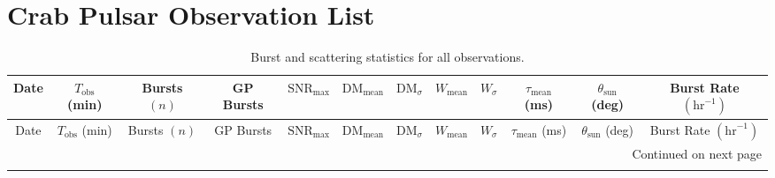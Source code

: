 
\chapter{Crab Pulsar Observation List} \label{appen:CrabTable}
\begin{landscape}

\begin{longtable}{cccccccccccc}
\caption{Burst and scattering statistics for all observations.}
\label{tab:bursts}\\

\toprule
Date &
$T_{\mathrm{obs}}$ (min) &
Bursts $(n)$ &
GP Bursts &
$\mathrm{SNR}_{\mathrm{max}}$ &
$\mathrm{DM}_{\mathrm{mean}}$ &
$\mathrm{DM}_{\sigma}$ &
$W_{\mathrm{mean}}$ &
$W_{\sigma}$ &
$\tau_{\mathrm{mean}}$ (ms) &
$\theta_{\mathrm{sun}}$ (deg) &
Burst Rate $(\mathrm{hr}^{-1})$ \\
\midrule
\endfirsthead

\toprule
Date &
$T_{\mathrm{obs}}$ (min) &
Bursts $(n)$ &
GP Bursts &
$\mathrm{SNR}_{\mathrm{max}}$ &
$\mathrm{DM}_{\mathrm{mean}}$ &
$\mathrm{DM}_{\sigma}$ &
$W_{\mathrm{mean}}$ &
$W_{\sigma}$ &
$\tau_{\mathrm{mean}}$ (ms) &
$\theta_{\mathrm{sun}}$ (deg) &
Burst Rate $(\mathrm{hr}^{-1})$ \\
\midrule
\endhead

\midrule
\multicolumn{12}{r}{Continued on next page}\\
\endfoot

\bottomrule
\endlastfoot



\end{longtable}

\end{landscape}
